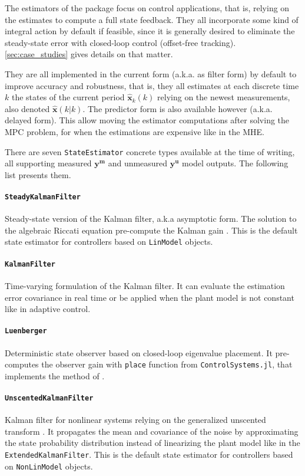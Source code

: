 The estimators of the package focus on control applications, that is, relying on the estimates to compute a full state feedback. They all incorporate some kind of integral action by default if feasible, since it is generally desired to eliminate the steady-state error with closed-loop control (offset-free tracking). \cref{sec:case_studies} gives details on that matter.

They are all implemented in the current form (a.k.a. as filter form) by default to improve accuracy and robustness, that is, they all estimates at each discrete time $k$ the states of the current period $\mathbf{\hat{x}}_k(k)$ relying on the newest measurements, also denoted $\mathbf{\hat{x}}(k|k)$. The predictor form is also available however (a.k.a. delayed form). This allow moving the estimator computations after solving the MPC problem, for when the estimations are expensive like in the MHE.

There are seven \texttt{StateEstimator} concrete types available at the time of writing, all supporting measured $\mathbf{y^m}$ and unmeasured $\mathbf{y^u}$ model outputs. The following list presents them.

\paragraph{\texttt{SteadyKalmanFilter}}
Steady-state version of the Kalman filter, a.k.a asymptotic form. The solution to the algebraic Riccati equation pre-compute the Kalman gain \citep{simon}. This is the default state estimator for controllers based on \texttt{LinModel} objects.

\paragraph{\texttt{KalmanFilter}}
Time-varying formulation of the Kalman filter. It can evaluate the estimation error covariance in real time or be applied when the plant model is not constant like in adaptive control.

\paragraph{\texttt{Luenberger}}
Deterministic state observer based on closed-loop eigenvalue placement. It pre-computes the observer gain with \texttt{place} function from \texttt{ControlSystems.jl}, that implements the method of \citet{placePoles}.

\paragraph{\texttt{UnscentedKalmanFilter}}
Kalman filter for nonlinear systems relying on the generalized unscented transform \citep{simon}. It propagates the mean and covariance of the noise by approximating the state probability distribution instead of linearizing the plant model like in the \texttt{ExtendedKalmanFilter}. This is the default state estimator for controllers based on \texttt{NonLinModel} objects.

